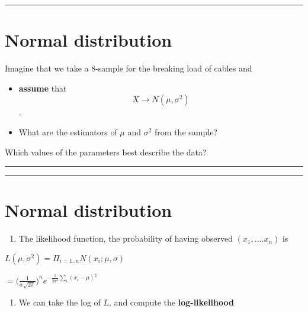 \documentclass[
]{book}
\providecommand{\tightlist}{%
  \setlength{\itemsep}{0pt}\setlength{\parskip}{0pt}}
\begin{document}
\begin{center}\rule{0.5\linewidth}{0.5pt}\end{center}

\hypertarget{normal-distribution-9}{%
\section{Normal distribution}\label{normal-distribution-9}}

Imagine that we take a \(8\)-sample for the breaking load of cables and

\begin{itemize}
\item
  \textbf{assume} that \[X \rightarrow N(\mu, \sigma^2)\].
\item
  What are the estimators of \(\mu\) and \(\sigma^2\) from the sample?
\end{itemize}

Which values of the parameters best describe the data?

\begin{center}\rule{0.5\linewidth}{0.5pt}\end{center}

\begin{center}\rule{0.5\linewidth}{0.5pt}\end{center}

\hypertarget{normal-distribution-10}{%
\section{Normal distribution}\label{normal-distribution-10}}

\begin{enumerate}
\def\labelenumi{\arabic{enumi}.}
\tightlist
\item
  The likelihood function, the probability of having observed \((x_1, ....x_n)\) is
\end{enumerate}

\(L(\mu, \sigma^2)=\Pi_{i=1..n} N(x_i;\mu,\sigma)\)

\(=\big( \frac{1}{\sigma \sqrt{2 \pi}}\big)^n e^{-\frac{1}{2\sigma^2} \sum_i(x_i-\mu)^2}\)

\begin{enumerate}
\def\labelenumi{\arabic{enumi}.}
\setcounter{enumi}{1}
\tightlist
\item
  We can take the log of \(L\), and compute the \textbf{log-likelihood}
\end{enumerate}
\end{document}
